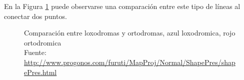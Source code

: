 \begin{description}
En la Figura \ref{fig:comparacion.entre.loxodromas.y.ortodromas} puede observarse una comparaci\'on entre este tipo de l\'ineas al conectar dos puntos.

\begin{figure}[!h]
  \centering
  \caption{Comparaci\'on entre loxodromas y ortodromas, azul loxodromica, rojo ortodromica \\{\footnotesize Fuente: \url{http://www.progonos.com/furuti/MapProj/Normal/ShapePres/shapePres.html}}}
  \label{fig:comparacion.entre.loxodromas.y.ortodromas}
\end{figure}

\end{description}

